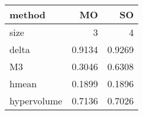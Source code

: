 \begin{tabular}{l r r}
  method &      MO &      SO\\\hline
    size &  3      &  4     \\
   delta &  0.9134 &  0.9269\\
      M3 &  0.3046 &  0.6308\\
   hmean &  0.1899 &  0.1896\\
hypervolume &  0.7136 &  0.7026\\
\end{tabular}
